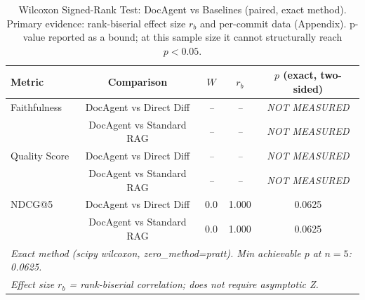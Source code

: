 \begin{table}[ht]
\centering
\caption{Wilcoxon Signed-Rank Test: DocAgent vs Baselines (paired, exact method).
Primary evidence: rank-biserial effect size $r_b$ and per-commit data (Appendix).
p-value reported as a bound; at this sample size it cannot structurally reach $p<0.05$.}
\label{tab:wilcoxon_tests}
\begin{tabular}{lcccc}
\hline
\textbf{Metric} & \textbf{Comparison} & $W$ & $r_b$ & $p$ (exact, two-sided) \\
\hline
Faithfulness & DocAgent vs Direct Diff & \textit{--} & \textit{--} & \textit{NOT MEASURED} \\
 & DocAgent vs Standard RAG & \textit{--} & \textit{--} & \textit{NOT MEASURED} \\
\hline
Quality Score & DocAgent vs Direct Diff & \textit{--} & \textit{--} & \textit{NOT MEASURED} \\
 & DocAgent vs Standard RAG & \textit{--} & \textit{--} & \textit{NOT MEASURED} \\
\hline
NDCG@5 & DocAgent vs Direct Diff & 0.0 & 1.000 & 0.0625 \\
 & DocAgent vs Standard RAG & 0.0 & 1.000 & 0.0625 \\
\hline
\multicolumn{5}{l}{\textit{Exact method (scipy wilcoxon, zero\_method=pratt). Min achievable $p$ at $n=5$: 0.0625.}} \\
\multicolumn{5}{l}{\textit{Effect size $r_b$ = rank-biserial correlation; does not require asymptotic Z.}} \\
\end{tabular}
\end{table}